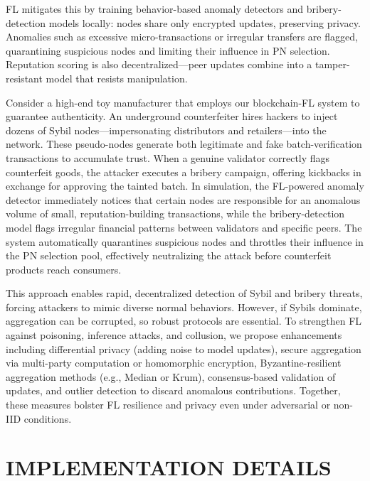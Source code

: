 \documentclass[conference]{IEEEtran}
\begin{document}
FL mitigates this by training behavior-based anomaly detectors and bribery-detection models locally: nodes share only encrypted updates, preserving privacy. Anomalies such as excessive micro-transactions or irregular transfers are flagged, quarantining suspicious nodes and limiting their influence in PN selection. Reputation scoring is also decentralized—peer updates combine into a tamper-resistant model that resists manipulation.

Consider a high-end toy manufacturer that employs our blockchain-FL system to guarantee authenticity. An underground counterfeiter hires hackers to inject dozens of Sybil nodes—impersonating distributors and retailers—into the network. These pseudo-nodes generate both legitimate and fake batch-verification transactions to accumulate trust. When a genuine validator correctly flags counterfeit goods, the attacker executes a bribery campaign, offering kickbacks in exchange for approving the tainted batch. In simulation, the FL-powered anomaly detector immediately notices that certain nodes are responsible for an anomalous volume of small, reputation-building transactions, while the bribery-detection model flags irregular financial patterns between validators and specific peers. The system automatically quarantines suspicious nodes and throttles their influence in the PN selection pool, effectively neutralizing the attack before counterfeit products reach consumers.

This approach enables rapid, decentralized detection of Sybil and bribery threats, forcing attackers to mimic diverse normal behaviors. However, if Sybils dominate, aggregation can be corrupted, so robust protocols are essential. To strengthen FL against poisoning, inference attacks, and collusion, we propose enhancements including differential privacy (adding noise to model updates), secure aggregation via multi-party computation or homomorphic encryption, Byzantine-resilient aggregation methods (e.g., Median or Krum), consensus-based validation of updates, and outlier detection to discard anomalous contributions. Together, these measures bolster FL resilience and privacy even under adversarial or non-IID conditions.

\section{IMPLEMENTATION DETAILS}
\end{document}
